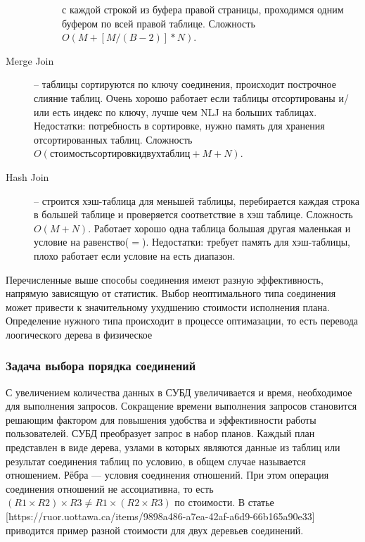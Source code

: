 \documentclass[12pt]{article}
\begin{document}
\begin{flushleft}
\begin{description}
\begin{description}
        с каждой строкой из буфера правой страницы, проходимся одним буфером по 
        всей правой таблице. Сложность $O(M + [M/(B-2)] * N)$.
    \end{description}
    \item[Merge Join] --  таблицы сортируются по ключу соединения, происходит 
    построчное  слияние таблиц. Очень хорошо работает если таблицы отсортированы 
    и/или есть индекс по ключу, лучше чем NLJ на больших таблицах. 
    Недостатки: потребность в сортировке, нужно память для хранения 
    отсортированных таблиц. Сложность $O(стоимость сортировки двух таблиц + M + N)$.
    \item[Hash Join] -- строится хэш-таблица для меньшей таблицы, перебирается 
    каждая строка в большей таблице и проверяется соответствие в хэш таблице. 
    Сложность $O(M+N)$. Работает хорошо одна таблица большая другая маленькая и 
    условие на равенство($=$). Недостатки: требует память для хэш-таблицы, плохо 
    работает если условие на есть диапазон.
\end{description}
Перечисленные выше способы соединения имеют разную эффективность, напрямую зависящую
от статистик. Выбор неоптимального типа соединения может привести к значительному 
ухудшению стоимости исполнения плана. Определение нужного типа происходит в процессе
оптимазации, то есть перевода лоогического дерева в физическое 

\centering \subsubsection*{Задача выбора порядка соединений}
\raggedright

С увеличением количества данных в СУБД увеличивается и время, необходимое для 
выполнения запросов. Сокращение времени выполнения запросов становится решающим 
фактором для повышения удобства и эффективности работы пользователей. СУБД 
преобразует запрос в набор планов. Каждый план представлен в виде дерева, узлами 
в которых являются данные из таблиц или результат соединения таблиц по условию, 
в общем случае называется отношением. Рёбра — условия соединения отношений.
При этом операция соединения отношений не ассоциативна, то есть
$(R1 \times R2) \times R3 \neq R1 \times (R2 \times R3)$ по стоимости.
В статье  [https://ruor.uottawa.ca/items/9898a486-a7ea-42af-a6d9-66b165a90e33] приводится
пример разной стоимости для двух деревьев соединений.
\begin{center}
\end{center}
\end{flushleft}
\end{document}
